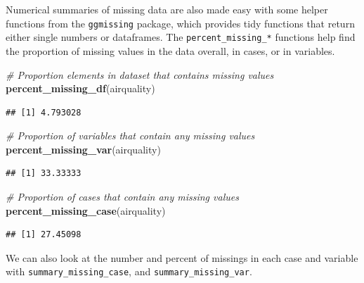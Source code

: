 \documentclass[]{article}
\newenvironment{Shaded}{\begin{snugshade}}{\end{snugshade}}
\newcommand{\KeywordTok}[1]{\textcolor[rgb]{0.13,0.29,0.53}{\textbf{{#1}}}}
\newcommand{\DecValTok}[1]{\textcolor[rgb]{0.00,0.00,0.81}{{#1}}}
\newcommand{\StringTok}[1]{\textcolor[rgb]{0.31,0.60,0.02}{{#1}}}
\newcommand{\CommentTok}[1]{\textcolor[rgb]{0.56,0.35,0.01}{\textit{{#1}}}}
\newcommand{\NormalTok}[1]{{#1}}
\begin{document}
Numerical summaries of missing data are also made easy with some helper
functions from the \texttt{ggmissing} package, which provides tidy
functions that return either single numbers or dataframes. The
\texttt{percent\_missing\_*} functions help find the proportion of
missing values in the data overall, in cases, or in variables.

\begin{Shaded}
\begin{Highlighting}[]
\CommentTok{# Proportion elements in dataset that contains missing values}
\KeywordTok{percent_missing_df}\NormalTok{(airquality)}
\end{Highlighting}
\end{Shaded}

\begin{verbatim}
## [1] 4.793028
\end{verbatim}

\begin{Shaded}
\begin{Highlighting}[]
\CommentTok{# Proportion of variables that contain any missing values}
\KeywordTok{percent_missing_var}\NormalTok{(airquality)}
\end{Highlighting}
\end{Shaded}

\begin{verbatim}
## [1] 33.33333
\end{verbatim}

\begin{Shaded}
\begin{Highlighting}[]
 \CommentTok{# Proportion of cases that contain any missing values}
\KeywordTok{percent_missing_case}\NormalTok{(airquality)}
\end{Highlighting}
\end{Shaded}

\begin{verbatim}
## [1] 27.45098
\end{verbatim}

We can also look at the number and percent of missings in each case and
variable with \texttt{summary\_missing\_case}, and
\texttt{summary\_missing\_var}.

\begin{Shaded}
\end{Shaded}
\end{document}
